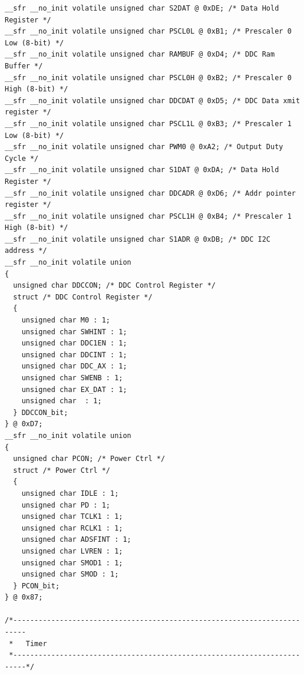 \documentclass[10pt,a4paper,final]{article}
\begin{document}
\begin{lstlisting}[label={list:first},caption=Code source]
__sfr __no_init volatile unsigned char S2DAT @ 0xDE; /* Data Hold Register */
__sfr __no_init volatile unsigned char PSCL0L @ 0xB1; /* Prescaler 0 Low (8-bit) */
__sfr __no_init volatile unsigned char RAMBUF @ 0xD4; /* DDC Ram Buffer */
__sfr __no_init volatile unsigned char PSCL0H @ 0xB2; /* Prescaler 0 High (8-bit) */
__sfr __no_init volatile unsigned char DDCDAT @ 0xD5; /* DDC Data xmit register */
__sfr __no_init volatile unsigned char PSCL1L @ 0xB3; /* Prescaler 1 Low (8-bit) */
__sfr __no_init volatile unsigned char PWM0 @ 0xA2; /* Output Duty Cycle */
__sfr __no_init volatile unsigned char S1DAT @ 0xDA; /* Data Hold Register */
__sfr __no_init volatile unsigned char DDCADR @ 0xD6; /* Addr pointer register */
__sfr __no_init volatile unsigned char PSCL1H @ 0xB4; /* Prescaler 1 High (8-bit) */
__sfr __no_init volatile unsigned char S1ADR @ 0xDB; /* DDC I2C address */
__sfr __no_init volatile union
{
  unsigned char DDCCON; /* DDC Control Register */
  struct /* DDC Control Register */
  {
    unsigned char M0 : 1;
    unsigned char SWHINT : 1;
    unsigned char DDC1EN : 1;
    unsigned char DDCINT : 1;
    unsigned char DDC_AX : 1;
    unsigned char SWENB : 1;
    unsigned char EX_DAT : 1;
    unsigned char  : 1;
  } DDCCON_bit;
} @ 0xD7;
__sfr __no_init volatile union
{
  unsigned char PCON; /* Power Ctrl */
  struct /* Power Ctrl */
  {
    unsigned char IDLE : 1;
    unsigned char PD : 1;
    unsigned char TCLK1 : 1;
    unsigned char RCLK1 : 1;
    unsigned char ADSFINT : 1;
    unsigned char LVREN : 1;
    unsigned char SMOD1 : 1;
    unsigned char SMOD : 1;
  } PCON_bit;
} @ 0x87;

/*-------------------------------------------------------------------------
 *   Timer
 *-------------------------------------------------------------------------*/


\end{lstlisting}
\end{document}
